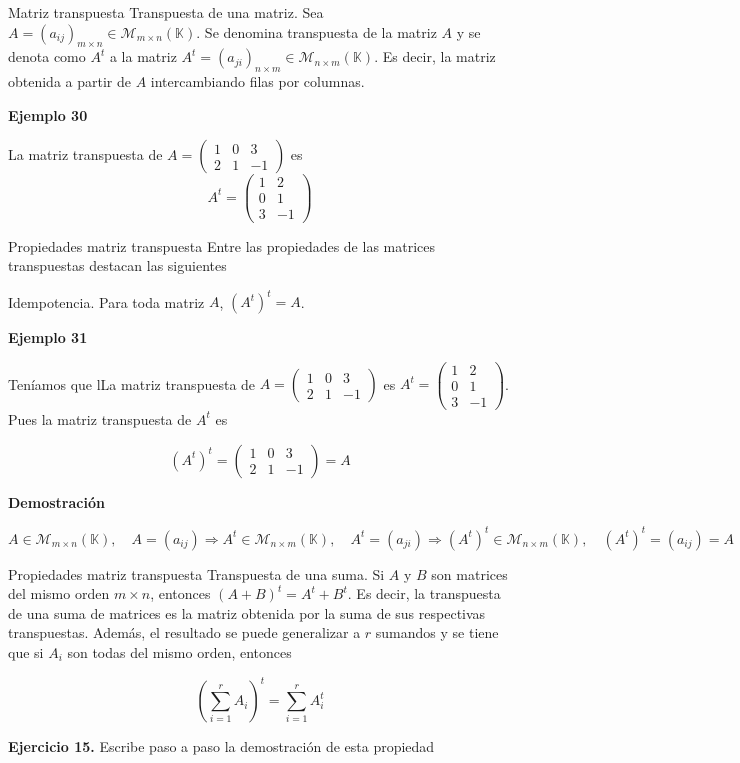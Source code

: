 \documentclass[
  ignorenonframetext,
]{beamer}
\begin{document}
\begin{frame}{Matriz transpuesta}
\protect\hypertarget{matriz-transpuesta}{}
Transpuesta de una matriz. Sea
\(A=(a_{ij})_{m\times n}\in\mathcal{M}_{m\times n}(\mathbb{K})\). Se
denomina transpuesta de la matriz \(A\) y se denota como \(A^t\) a la
matriz
\(A^t=(a_{ji})_{n\times m}\in\mathcal{M}_{n\times m}(\mathbb{K})\). Es
decir, la matriz obtenida a partir de \(A\) intercambiando filas por
columnas.

\textbf{Ejemplo 30}

La matriz transpuesta de
\(A = \begin{pmatrix}1&0&3\\2&1&-1\end{pmatrix}\) es
\[A^t=\begin{pmatrix}1&2\\0&1\\3&-1\end{pmatrix}\]
\end{frame}

\begin{frame}{Propiedades matriz transpuesta}
\protect\hypertarget{propiedades-matriz-transpuesta}{}
Entre las propiedades de las matrices transpuestas destacan las
siguientes

Idempotencia. Para toda matriz \(A\), \((A^t)^t = A\).

\textbf{Ejemplo 31}

Teníamos que lLa matriz transpuesta de
\(A = \begin{pmatrix}1&0&3\\2&1&-1\end{pmatrix}\) es
\(A^t=\begin{pmatrix}1&2\\0&1\\3&-1\end{pmatrix}\). Pues la matriz
transpuesta de \(A^t\) es

\[(A^t)^t = \begin{pmatrix}1&0&3\\2&1&-1\end{pmatrix}=A\]

\textbf{Demostración}

\[A\in\mathcal{M}_{m\times n}(\mathbb{K}),\quad A = (a_{ij})\Rightarrow A^t\in\mathcal{M}_{n\times m}(\mathbb{K}),\quad A^t = (a_{ji})\Rightarrow (A^t)^t\in\mathcal{M}_{n\times m}(\mathbb{K}),\quad (A^t)^t = (a_{ij}) = A\]
\end{frame}

\begin{frame}{Propiedades matriz transpuesta}
\protect\hypertarget{propiedades-matriz-transpuesta-1}{}
Transpuesta de una suma. Si \(A\) y \(B\) son matrices del mismo orden
\(m\times n\), entonces \((A+B)^t = A^t+B^t\). Es decir, la transpuesta
de una suma de matrices es la matriz obtenida por la suma de sus
respectivas transpuestas. Además, el resultado se puede generalizar a
\(r\) sumandos y se tiene que si \(A_i\) son todas del mismo orden,
entonces

\[\left(\sum_{i=1}^r A_i\right)^t=\sum_{i=1}^rA_i^t\]

\textbf{Ejercicio 15.} Escribe paso a paso la demostración de esta
propiedad
\end{frame}
\end{document}
